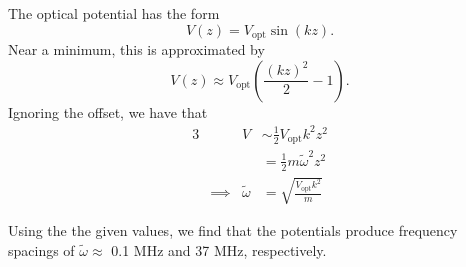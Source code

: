 \documentclass[12pt]{article}
\begin{document}
The optical potential has the form
\[ V(z) = V_\text{opt}\sin(kz). \]
Near a minimum, this is approximated by
\[ V(z) \approx V_\text{opt}\left(\frac{(kz)^2}{2} - 1\right). \]
Ignoring the offset, we have that
\begin{alignat*}{3}
    &\quad & V &\sim \frac{1}{2}V_\text{opt}k^2z^2 \\
    & & &= \frac{1}{2}m\tilde{\omega}^2z^2 \\
    &\implies & \tilde{\omega} &= \sqrt{\frac{V_\text{opt}k^2}{m}}
\end{alignat*}

Using the the given values, we find that the potentials produce frequency spacings of $\tilde{\omega} \approx $ 0.1 MHz and 37 MHz, respectively.



\end{document}
